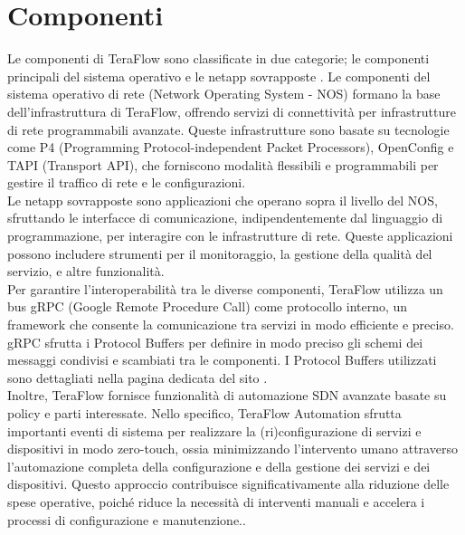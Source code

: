\section{Componenti}
Le componenti di TeraFlow sono classificate in due categorie; le componenti principali del sistema operativo e le netapp sovrapposte \cite{Component}. 
Le componenti del sistema operativo di rete (Network Operating System - NOS) formano la base dell'infrastruttura di TeraFlow, offrendo servizi di connettività per infrastrutture di rete programmabili avanzate. %
Queste infrastrutture sono basate su tecnologie come P4 (Programming Protocol-independent Packet Processors), OpenConfig e TAPI (Transport API), che forniscono modalità flessibili e programmabili per gestire il traffico di rete e le configurazioni.
\\Le netapp sovrapposte sono applicazioni che operano sopra il livello del NOS, sfruttando le interfacce di comunicazione, indipendentemente dal linguaggio di programmazione, per interagire con le infrastrutture di rete.
Queste applicazioni possono includere strumenti per il monitoraggio, la gestione della qualità del servizio, e altre funzionalità.
\\Per garantire l'interoperabilità tra le diverse componenti, TeraFlow utilizza un bus gRPC (Google Remote Procedure Call) come protocollo interno, 
un framework che consente la comunicazione tra servizi in modo efficiente e preciso. 
gRPC sfrutta i Protocol Buffers per definire in modo preciso gli schemi dei messaggi condivisi e scambiati tra le componenti. %
I Protocol Buffers utilizzati sono dettagliati nella pagina dedicata del sito \cite{ProtoBuf}.
\\Inoltre, TeraFlow fornisce funzionalità di automazione SDN avanzate basate su policy e parti interessate. Nello specifico, TeraFlow Automation sfrutta 
importanti eventi di sistema per realizzare la (ri)configurazione di servizi e dispositivi in modo zero-touch, ossia minimizzando l'intervento umano attraverso l'automazione completa della configurazione e della gestione dei servizi e dei dispositivi.
Questo approccio contribuisce significativamente alla riduzione delle spese operative, poiché riduce la necessità di interventi manuali e accelera i processi di configurazione e manutenzione.\cite{Component}.
